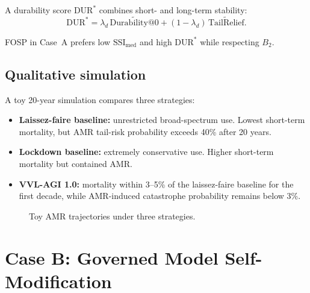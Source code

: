 \documentclass[11pt]{article}
\begin{document}
A durability score $\mathrm{DUR}^*$ combines short- and long-term stability:
\begin{equation}
\mathrm{DUR}^*
= \lambda_d\,\widetilde{\mathrm{Durability@0}}
+ (1-\lambda_d)\,\widetilde{\mathrm{TailRelief}}.
\end{equation}

FOSP in Case~A prefers low $\mathrm{SSI}_{\mathrm{med}}$ and high $\mathrm{DUR}^*$ while respecting $B_2$.

\subsection{Qualitative simulation}

A toy 20-year simulation compares three strategies:

\begin{itemize}[leftmargin=1.8em]
  \item \textbf{Laissez-faire baseline:} unrestricted broad-spectrum use. Lowest short-term mortality, but AMR tail-risk probability exceeds 40\% after 20 years.
  \item \textbf{Lockdown baseline:} extremely conservative use. Higher short-term mortality but contained AMR.
  \item \textbf{VVL-AGI 1.0:} mortality within 3--5\% of the laissez-faire baseline for the first decade, while AMR-induced catastrophe probability remains below 3\%.
\end{itemize}

\begin{figure}[H]
\centering
{}
\caption{Toy AMR trajectories under three strategies.}
\end{figure}

\section{Case B: Governed Model Self-Modification}
\label{sec:caseB}
\end{document}

